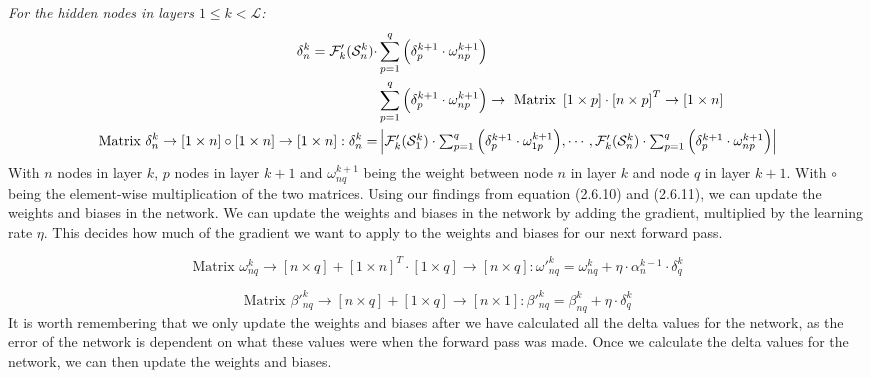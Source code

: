 \documentclass{report}
\begin{document}
\textit{For the hidden nodes in layers $1\leq k < \mathcal{L}$:}
\begin{align}
    \delta^{k}_{n} = \mathcal{F}'_{k}(\mathcal{S}^{k}_n)\cdot&\sum_{p=1}^{q}\Big(\delta^{k+1}_{p} \cdot \omega^{k+1}_{np}\Big) \notag\\
    &\sum_{p=1}^{q}\Big(\delta^{k+1}_{p} \cdot \omega^{k+1}_{np}\Big) \rightarrow \text{ Matrix } \left[1 \times p\right] \cdot \left[n \times p\right]^{T} \rightarrow \left[1 \times n\right]\notag\\
    \text{Matrix }\delta^{k}_{n} \rightarrow \left[1 \times n\right] \circ \left[1 \times n\right]  \rightarrow \left[1 \times n\right] :  \delta^{k}_{n} =&
    \begin{vmatrix}
        \mathcal{F}'_{k}(\mathcal{S}^{k}_1)\cdot\sum_{p=1}^{q}\Big(\delta^{k+1}_{p} \cdot \omega^{k+1}_{1p}\Big), \cdots,\mathcal{F}'_{k}(\mathcal{S}^{k}_n)\cdot\sum_{p=1}^{q}\Big(\delta^{k+1}_{p} \cdot \omega^{k+1}_{np}\Big)
    \end{vmatrix}
\end{align}
With $n$ nodes in layer $k$, $p$ nodes in layer $k+1$ and $\omega_{nq}^{k+1}$ being the weight between node $n$ in layer $k$ and node $q$ in layer $k+1$.
With $\circ$ being the element-wise multiplication of the two matrices.
\vspace{1em}
\newline
Using our findings from equation (2.6.10) and (2.6.11), we can update the weights and biases in the network.
We can update the weights and biases in the network by adding the gradient, multiplied by the learning rate $\eta$.  
This decides how much of the gradient we want to apply to the weights and biases for our next forward pass.

\begin{equation}
    \text{Matrix }\omega^{k}_{nq}\rightarrow\left[n \times q\right] + \left[1 \times n\right]^T \cdot \left[1 \times q\right]  \rightarrow \left[n \times q\right] :\omega'^{k}_{nq} = \omega^{k}_{nq} + \eta\cdot\alpha_{n}^{k-1}\cdot\delta^{k}_{q}
\end{equation}

\begin{equation}
    \text{Matrix }\beta'^{k}_{nq}\rightarrow \left[n \times q\right] + \left[1 \times q\right]  \rightarrow \left[n \times 1\right] :\beta'^{k}_{nq} = \beta^{k}_{nq} + \eta\cdot\delta^{k}_{q}
\end{equation}
It is worth remembering that we only update the weights and biases after we have calculated all the delta values for the network, as the error of the network is dependent on what these values were when the forward pass was made.
Once we calculate the delta values for the network, we can then update the weights and biases.
\end{document}
